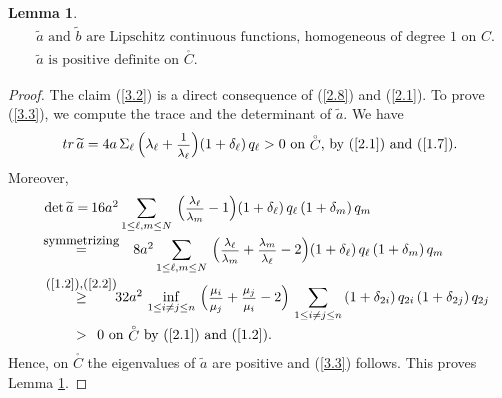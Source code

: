 \documentclass[12pt,leqno]{article}
\def\dis{\displaystyle}
\def\f{\footnotesize}
\def\wt{\widetilde}
\newtheorem{lemma}[theorem]{Lemma}
\begin{document}
\begin{lemma}\label{lem3.1}
\begin{align}
&\mbox{$\wt{a}$ and $\wt{b}$ are Lipschitz continuous functions, homogeneous of degree $1$ on $C$.} \label{3.2}
\\[1ex]
& \mbox{$\wt{a}$ is positive definite on $\stackrel{_\circ}{C}$.} \label{3.3}
\end{align}
\end{lemma}

\begin{proof}
The claim (\ref{3.2}) is a direct consequence of (\ref{2.8}) and (\ref{2.1}). To prove (\ref{3.3}), we compute the trace and the determinant of $\wt{a}$. We have
\begin{equation}\label{3.4}
\mbox{$tr \, \wt{a} = 4a \, \Sigma_\ell \, \Big(\lambda_\ell + \mbox{\f $\dis\frac{1}{\lambda_\ell}$}\Big) (1 + \delta_\ell) \, q_\ell > 0$ on $\stackrel{_\circ}{C}$, by (\ref{2.1}) and (\ref{1.7})}.
\end{equation}
Moreover,
\begin{equation}\label{3.5}
\begin{array}{lcl}
&\hspace{-5ex} {\rm det} \,\wt{a}  = &\hspace{-7ex} 16 a^2  \dis\sum_{1 \le  \ell, m \le N} \, \Big(\mbox{\f $\dis\frac{\lambda_\ell}{\lambda_m}$} - 1\Big) (1 + \delta_\ell) \,q_\ell \,(1 + \delta_m) \, q_m
\\[3ex]
& \stackrel{\mbox{\small symmetrizing}}{=} & 8a^2 \dis\sum_{1 \le  \ell, m \le N} \,\Big(\mbox{\f $\dis\frac{\lambda_\ell}{\lambda_m}$} + \mbox{\f $\dis\frac{\lambda_m}{\lambda_\ell}$} - 2 \Big)  (1 + \delta_\ell) \, q_\ell\,(1 + \delta_m) \, q_m
\\[3ex]
& \stackrel{\mbox{\small (\ref{1.2}),(\ref{2.2})}}{\ge} &\hspace{-3ex}  32 a^2 \,\inf\limits_{1 \le i \not= j \le n} \,\Big(\mbox{\f $\dis\frac{\mu_i}{\mu_j}$} + \mbox{\f $\dis\frac{\mu_j}{\mu_i}$} - 2\Big) \, \dis\sum_{1 \le i \not= j \le n} \,(1 + \delta_{2i}) \,q_{2i} \,(1 + \delta_{2j}) \, q_{2j}
\\[3ex]
& > & \hspace{-6ex} \mbox{$0$ on $\stackrel{_\circ}{C}$ by (\ref{2.1}) and (\ref{1.2})}.
\end{array}
\end{equation}
Hence, on $\stackrel{_\circ}{C}$ the eigenvalues of $\wt{a}$ are positive and (\ref{3.3}) follows. This proves Lemma \ref{lem3.1}.
\end{proof}
\end{document}
